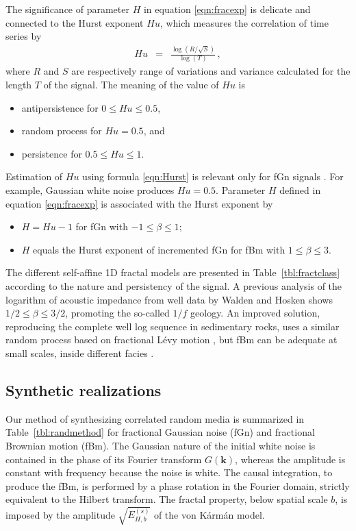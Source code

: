 The significance of parameter $H$ in equation \ref{eqn:fracexp} is delicate and connected to the Hurst exponent $Hu$,
which measures the correlation of time series \cite[]{Hurst_51} by
\begin{eqnarray}
Hu & = & \frac{\log\left(R/\sqrt{S}\right)}{\log(T)}\,, \label{eqn:Hurst}
\end{eqnarray}
where $R$ and $S$ are respectively range of variations and variance
calculated for the length $T$ of the signal. The meaning of the value of $Hu$ is 
\begin{itemize} 
\item antipersistence for $0\leq Hu\leq 0.5$,
\item random process for $Hu=0.5$, and
\item persistence for $0.5\leq Hu\leq 1$.
\end{itemize}
Estimation of $Hu$ using formula \ref{eqn:Hurst} is relevant only for fGn signals \cite[]{Turcotte_97}.
For example, Gaussian white noise produces $Hu=0.5$.
Parameter $H$ defined in equation \ref{eqn:fracexp} is associated with the Hurst exponent by
\begin{itemize} 
\item $H=Hu-1$ for fGn with $-1\leq\beta\leq 1$;
\item $H$ equals the Hurst exponent of incremented fGn \cite[]{Li_03} for fBm with $1\leq\beta\leq 3$.
\end{itemize}
The different self-affine 1D fractal models are presented in Table~\ref{tbl:fractclass}
according to the nature and persistency of the signal.
A previous analysis of the logarithm of acoustic impedance from well data
by Walden and Hosken  shows $1/2 \leq \beta \leq 3/2$, promoting the so-called $1/f$ geology.
An improved solution, reproducing the complete well log sequence in sedimentary rocks, uses
a similar random process based on fractional L\'evy motion \cite[]{Painter_P94}, 
but fBm can be adequate at small scales, inside different facies \cite[]{Lu_MFC02}.
 

\subsection{Synthetic realizations}


Our method of synthesizing correlated random media is summarized in Table~\ref{tbl:randmethod}
for fractional Gaussian noise (fGn) and fractional Brownian motion (fBm).
The Gaussian nature of the initial white noise is contained in the phase of its Fourier transform $G(\mathbf{k})$, 
whereas the amplitude is constant with frequency  because the noise is white.
The causal integration, to produce the fBm, is performed by a phase rotation in the Fourier domain, strictly equivalent to the Hilbert transform.
The fractal property, below spatial scale $b$, is imposed by the amplitude $\sqrt{E^{(s)}_{H,b}}$ of the von K\'arm\'an model.

